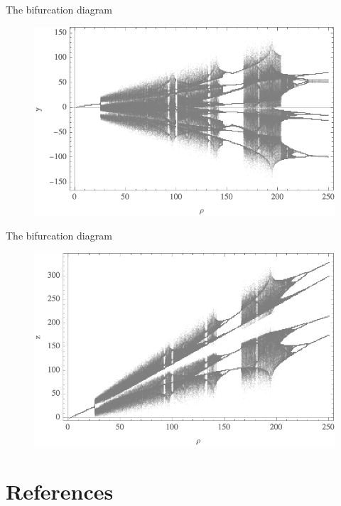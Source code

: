 \documentclass[hyperref={pdfpagelabels=false}]{beamer}
\begin{document}
\begin{frame}{The bifurcation diagram}
 

\begin{figure}

\includegraphics[width=\linewidth]{Figures/y.png}

\end{figure}


\end{frame}

\begin{frame}{The bifurcation diagram}
 

\begin{figure}

\includegraphics[width=\linewidth]{Figures/z.png}

\end{figure}


\end{frame}


\section{References}
\end{document}
